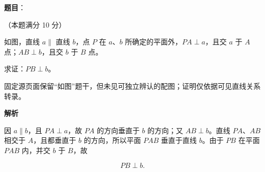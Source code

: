 \begin{answer}

\textbf{题目}：

（本题满分 10 分）

如图，直线 $a\parallel$ 直线 $b$，点 $P$ 在 $a\text{、}b$ 所确定的平面外，$PA\perp a$，且交 $a$ 于 $A$ 点；$AB\perp b$，且交 $b$ 于 $B$ 点。

求证：$PB\perp b$。

\begin{gktip}
固定源页面保留“如图”题干，但未见可独立辨认的配图；证明仅依据可见直线关系转录。
\end{gktip}

\textbf{解析}

因 $a\parallel b$，且 $PA\perp a$，故 $PA$ 的方向垂直于
$b$ 的方向；又 $AB\perp b$。直线 $PA\text{、}AB$ 相交于 $A$，且都垂直于 $b$ 的方向，所以平面 $PAB$ 垂直于直线 $b$。由于 $PB$ 在平面 $PAB$ 内，并交 $b$ 于 $B$，故

\nopagebreak[4]
\[
PB\perp b.
\]


\end{answer}
